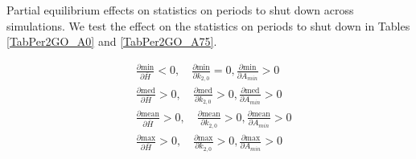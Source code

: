 \documentclass[letterpaper,12pt]{article}
\theoremstyle{definition}
\begin{document}
\begin{spacing}{1.5}
  \clearpage

  Partial equilibrium effects on statistics on periods to shut down across simulations. We test the effect on the statistics on periods to shut down in Tables \ref{TabPer2GO_A0} and \ref{TabPer2GO_A75}.

  \begin{equation*}
    \begin{split}
      &\frac{\partial\text{min}}{\partial\bar{H}}< 0, \quad \frac{\partial\text{min}}{\partial k_{2,0}}=0, \frac{\partial\text{min}}{\partial A_{min}}> 0 \\
      &\frac{\partial\text{med}}{\partial\bar{H}}> 0, \quad \frac{\partial\text{med}}{\partial k_{2,0}}> 0, \frac{\partial\text{med}}{\partial A_{min}}> 0 \\
      &\frac{\partial\text{mean}}{\partial\bar{H}}> 0, \quad \frac{\partial\text{mean}}{\partial k_{2,0}}> 0, \frac{\partial\text{mean}}{\partial A_{min}}> 0 \\
      &\frac{\partial\text{max}}{\partial\bar{H}}> 0, \quad \frac{\partial\text{max}}{\partial k_{2,0}}> 0, \frac{\partial\text{max}}{\partial A_{min}}> 0
    \end{split}
  \end{equation*}

  \newpage


\end{spacing}
\end{document}
